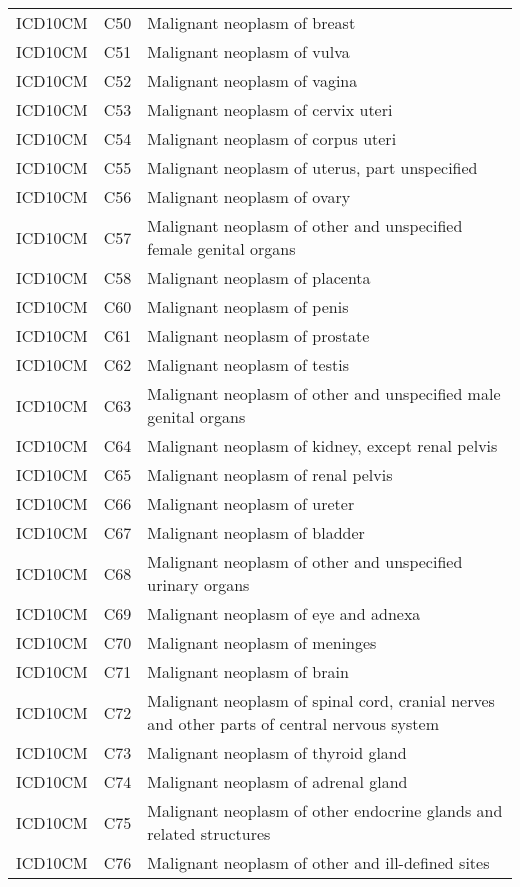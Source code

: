 \begin{longtable}{p{}p{}p{}}
  ICD10CM & C50 & Malignant neoplasm of breast \\ 
  ICD10CM & C51 & Malignant neoplasm of vulva \\ 
  ICD10CM & C52 & Malignant neoplasm of vagina \\ 
  ICD10CM & C53 & Malignant neoplasm of cervix uteri \\ 
  ICD10CM & C54 & Malignant neoplasm of corpus uteri \\ 
  ICD10CM & C55 & Malignant neoplasm of uterus, part unspecified \\ 
  ICD10CM & C56 & Malignant neoplasm of ovary \\ 
  ICD10CM & C57 & Malignant neoplasm of other and unspecified female genital organs \\ 
  ICD10CM & C58 & Malignant neoplasm of placenta \\ 
  ICD10CM & C60 & Malignant neoplasm of penis \\ 
  ICD10CM & C61 & Malignant neoplasm of prostate \\ 
  ICD10CM & C62 & Malignant neoplasm of testis \\ 
  ICD10CM & C63 & Malignant neoplasm of other and unspecified male genital organs \\ 
  ICD10CM & C64 & Malignant neoplasm of kidney, except renal pelvis \\ 
  ICD10CM & C65 & Malignant neoplasm of renal pelvis \\ 
  ICD10CM & C66 & Malignant neoplasm of ureter \\ 
  ICD10CM & C67 & Malignant neoplasm of bladder \\ 
  ICD10CM & C68 & Malignant neoplasm of other and unspecified urinary organs \\ 
  ICD10CM & C69 & Malignant neoplasm of eye and adnexa \\ 
  ICD10CM & C70 & Malignant neoplasm of meninges \\ 
  ICD10CM & C71 & Malignant neoplasm of brain \\ 
  ICD10CM & C72 & Malignant neoplasm of spinal cord, cranial nerves and other parts of central nervous system \\ 
  ICD10CM & C73 & Malignant neoplasm of thyroid gland \\ 
  ICD10CM & C74 & Malignant neoplasm of adrenal gland \\ 
  ICD10CM & C75 & Malignant neoplasm of other endocrine glands and related structures \\ 
  ICD10CM & C76 & Malignant neoplasm of other and ill-defined sites \\ 

\end{longtable}
